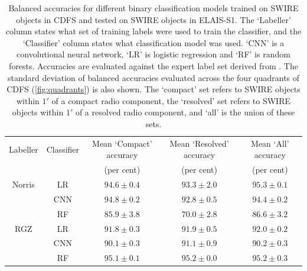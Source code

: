 \documentclass[fleqn,usenatbib,usedcolumn]{mnras}
\begin{document}
  \begin{table}
    \caption{Balanced accuracies for different binary classification models trained on SWIRE objects
    in CDFS and tested on SWIRE objects in ELAIS-S1.
    The `Labeller' column states what set of training labels
    were used to train the classifier, and the `Classifier' column states what
    classification model was used. `CNN' is a convolutional neural network,
    `LR' is logistic regression and `RF' is random forests. Accuracies are evaluated against the expert
    label set derived from \citet{middelberg08}. The standard deviation of balanced accuracies evaluated across the four quadrants of
    CDFS (\autoref{fig:quadrants}) is also shown. The `compact' set refers to SWIRE
    objects within $1'$ of a compact radio component, the `resolved' set refers to
    SWIRE objects within $1'$ of a resolved radio component, and `all' is the union of these sets.}
    \label{tab:elais-ba}
    \begin{tabular}{ccccc}
      \hline
      Labeller & Classifier & Mean `Compact' accuracy & Mean `Resolved' accuracy & Mean `All' accuracy\\
        &  & (per cent) & (per cent) & (per cent)\\
      \hline
      Norris & LR & $94.6 \pm 0.4$ & $93.3 \pm 2.0$ & $95.3 \pm 0.1$\\
       & CNN & $94.8 \pm 0.2$ & $92.8 \pm 0.5$ & $94.4 \pm 0.2$\\
       & RF & $85.9 \pm 3.8$ & $70.0 \pm 2.8$ & $86.6 \pm 3.2$\\
      RGZ & LR & $91.8 \pm 0.3$ & $91.9 \pm 0.5$ & $92.0 \pm 0.2$\\
       & CNN & $90.1 \pm 0.3$ & $91.1 \pm 0.9$ & $90.2 \pm 0.3$\\
       & RF & $95.1 \pm 0.1$ & $95.2 \pm 0.0$ & $95.2 \pm 0.3$\\
      \hline
    \end{tabular}
  \end{table}
\end{document}
